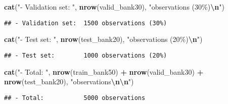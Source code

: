 \documentclass[
]{article}
\newenvironment{Shaded}{\begin{snugshade}}{\end{snugshade}}
\newcommand{\FunctionTok}[1]{\textcolor[rgb]{0.13,0.29,0.53}{\textbf{#1}}}
\newcommand{\NormalTok}[1]{#1}
\newcommand{\SpecialCharTok}[1]{\textcolor[rgb]{0.81,0.36,0.00}{\textbf{#1}}}
\newcommand{\StringTok}[1]{\textcolor[rgb]{0.31,0.60,0.02}{#1}}
\begin{document}
\begin{Shaded}
\begin{Highlighting}[]
\FunctionTok{cat}\NormalTok{(}\StringTok{"{-} Validation set: "}\NormalTok{, }\FunctionTok{nrow}\NormalTok{(valid\_bank30), }\StringTok{"observations (30\%)}\SpecialCharTok{\textbackslash{}n}\StringTok{"}\NormalTok{)}
\end{Highlighting}
\end{Shaded}

\begin{verbatim}
## - Validation set:  1500 observations (30%)
\end{verbatim}

\begin{Shaded}
\begin{Highlighting}[]
\FunctionTok{cat}\NormalTok{(}\StringTok{"{-} Test set:       "}\NormalTok{, }\FunctionTok{nrow}\NormalTok{(test\_bank20), }\StringTok{"observations (20\%)}\SpecialCharTok{\textbackslash{}n}\StringTok{"}\NormalTok{)}
\end{Highlighting}
\end{Shaded}

\begin{verbatim}
## - Test set:        1000 observations (20%)
\end{verbatim}

\begin{Shaded}
\begin{Highlighting}[]
\FunctionTok{cat}\NormalTok{(}\StringTok{"{-} Total:          "}\NormalTok{, }\FunctionTok{nrow}\NormalTok{(train\_bank50) }\SpecialCharTok{+} \FunctionTok{nrow}\NormalTok{(valid\_bank30) }\SpecialCharTok{+} \FunctionTok{nrow}\NormalTok{(test\_bank20), }\StringTok{"observations}\SpecialCharTok{\textbackslash{}n\textbackslash{}n}\StringTok{"}\NormalTok{)}
\end{Highlighting}
\end{Shaded}

\begin{verbatim}
## - Total:           5000 observations
\end{verbatim}
\end{document}
